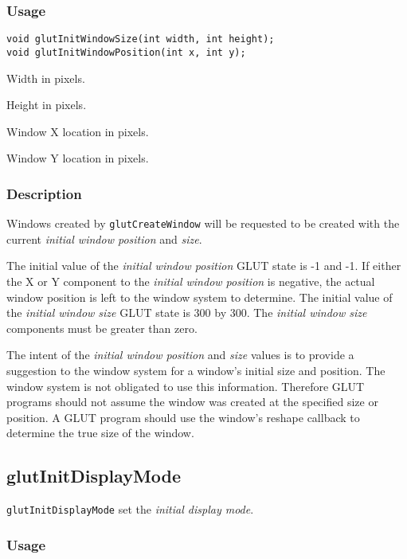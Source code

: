 \subsubsection*{Usage}

\begin{verbatim}
void glutInitWindowSize(int width, int height);
void glutInitWindowPosition(int x, int y);
\end{verbatim}
\begin{description}
\itemsep 0in
\item[\tt width]
Width in pixels.
\item[\tt height]
Height in pixels.
\item[\tt x]
Window X location in pixels.
\item[\tt y]
Window Y location in pixels.
\end{description}

\subsubsection*{Description}

Windows created by {\tt glutCreateWindow} will be requested to be created
with the current {\em initial window position} and {\em size}.

The initial value of the {\em initial window position} GLUT state is
-1 and -1.  If either the X or Y component to the {\em initial
window position} is negative, the actual window position is left
to the window system to determine.
The initial value of the {\em initial window size} GLUT state is 300 by 300.
The {\em initial window size} components must be greater than zero.

The intent of the {\em initial window position} and {\em size} values is
to provide a suggestion to the window system for a window's initial size
and position.  The window system is not obligated to use this information.
Therefore GLUT programs should not assume the window was created at the
specified size or position.  A GLUT program should use the window's
reshape callback to determine the true size of the window.

\subsection{glutInitDisplayMode}

{\tt glutInitDisplayMode} set the {\em initial display mode}.

\subsubsection*{Usage}

